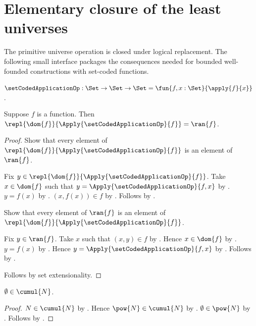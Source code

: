 

\section{Elementary closure of the least universes}

The primitive universe operation is closed under logical replacement.  The
following small interface packages the consequences needed for bounded
well-founded constructions with set-coded functions.

\begin{definition}\label{set_coded_application_op}
    $\setCodedApplicationOp:\Set\to\Set\to\Set
        =\fun{f,x:\Set}{\apply{f}{x}}$.
\end{definition}

\begin{proposition}\label{replacement_of_set_coded_function_is_range}
    Suppose $f$ is a function.
    Then
        $\repl{\dom{f}}{\Apply{\setCodedApplicationOp}{f}}=\ran{f}$.
\end{proposition}
\begin{proof}
    Show that every element of
        $\repl{\dom{f}}{\Apply{\setCodedApplicationOp}{f}}$
        is an element of $\ran{f}$.
    \begin{subproof}
        Fix $y\in\repl{\dom{f}}{\Apply{\setCodedApplicationOp}{f}}$.
        Take $x\in\dom{f}$ such that
            $y=\Apply{\setCodedApplicationOp}{f,x}$
            by \auto.
        $y=f(x)$ by .
        $(x,f(x))\in f$ by .
        Follows by .
    \end{subproof}
    Show that every element of $\ran{f}$ is an element of
        $\repl{\dom{f}}{\Apply{\setCodedApplicationOp}{f}}$.
    \begin{subproof}
        Fix $y\in\ran{f}$.
        Take $x$ such that $(x,y)\in f$ by .
        Hence $x\in\dom{f}$ by .
        $y=f(x)$ by .
        Hence $y=\Apply{\setCodedApplicationOp}{f,x}$
            by .
        Follows by \auto.
    \end{subproof}
    Follows by set extensionality.
\end{proof}

\begin{proposition}\label{universe_contains_emptyset}
    $\emptyset\in\cumul{N}$.
\end{proposition}
\begin{proof}
    $N\in\cumul{N}$ by .
    Hence $\pow{N}\in\cumul{N}$
        by .
    $\emptyset\in\pow{N}$ by .
    Follows by .
\end{proof}

